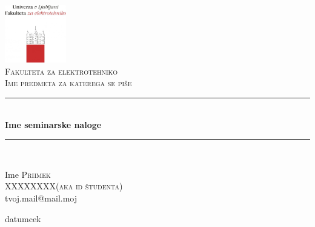\begin{titlepage}
\begin{center}
\newcommand{\Hline}{\rule{\linewidth}{0.5mm}}

\includegraphics[width=0.20\textwidth]{logo_fe.jpg}\\[1cm]
\textsc{\LARGE Fakulteta za elektrotehniko}\\[1.5cm]
\textsc{\Large Ime predmeta za katerega se piše}\\[0.5cm]

\Hline \\[0.5cm]
{ \huge \bfseries Ime seminarske naloge}\\[0.2cm]
\Hline \\[1.5cm]
\end{center}
Ime \textsc{Priimek\\XXXXXXXX(aka id študenta)}\\
tvoj.mail@mail.moj
\begin{center}
\vfill

{\large datumcek}
\end{center}
\end{titlepage}
